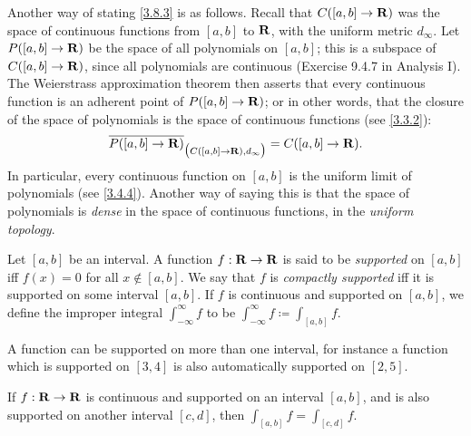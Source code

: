 \begin{note}
  Another way of stating \cref{3.8.3} is as follows.
  Recall that \(C([a, b] \to \mathbf{R})\) was the space of continuous functions from \([a, b]\) to \(\mathbf{R}\), with the uniform metric \(d_\infty\).
  Let \(P([a, b] \to \mathbf{R})\) be the space of all polynomials on \([a, b]\);
  this is a subspace of \(C([a, b] \to \mathbf{R})\), since all polynomials are continuous (Exercise 9.4.7 in Analysis I).
  The Weierstrass approximation theorem then asserts that every continuous function is an adherent point of \(P([a, b] \to \mathbf{R})\);
  or in other words, that the closure of the space of polynomials is the space of continuous functions (see \cref{3.3.2}):
  \[
    \overline{P([a, b] \to \mathbf{R})}_{\big(C([a, b] \to \mathbf{R}), d_\infty\big)} = C([a, b] \to \mathbf{R}).
  \]
  In particular, every continuous function on \([a, b]\) is the uniform limit of polynomials (see \cref{3.4.4}).
  Another way of saying this is that the space of polynomials is \emph{dense} in the space of continuous functions, in the \emph{uniform topology}.
\end{note}

\begin{definition}\label{3.8.4}
  Let \([a, b]\) be an interval.
  A function \(f : \mathbf{R} \to \mathbf{R}\) is said to be \emph{supported} on \([a, b]\) iff \(f(x) = 0\) for all \(x \notin [a, b]\).
  We say that \(f\) is \emph{compactly supported} iff it is supported on some interval \([a, b]\).
  If \(f\) is continuous and supported on \([a, b]\), we define the improper integral \(\int_{-\infty}^\infty f\) to be \(\int_{-\infty}^\infty f \coloneqq \int_{[a, b]} f\).
\end{definition}

\begin{note}
  A function can be supported on more than one interval, for instance a function which is supported on \([3, 4]\) is also automatically supported on \([2, 5]\).
\end{note}

\begin{lemma}\label{3.8.5}
  If \(f : \mathbf{R} \to \mathbf{R}\) is continuous and supported on an interval \([a, b]\), and is also supported on another interval \([c, d]\), then \(\int_{[a, b]} f = \int_{[c, d]} f\).
\end{lemma}

